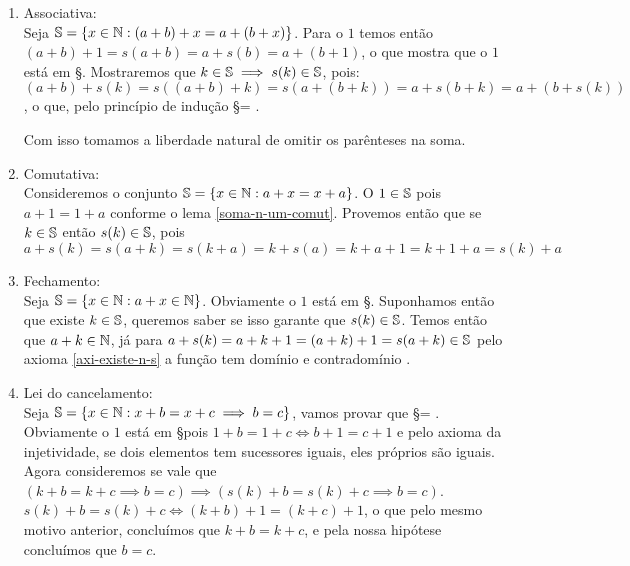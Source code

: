 \documentclass[../main.tex]{subfiles}
\begin{document}
\begin{dem}
    \begin{enumerate}[label=(\roman*)]
        \item Associativa: \\
             Seja $\S = \{ x \in \N : (a + b) + x = a + (b + x) \}$. Para o $1$ temos então
             $(a + b) + 1 = s(a + b) = a + s(b) = a + (b + 1)$, o que mostra que o $1$ está em \S. 
             Mostraremos que $k \in \S \implies s(k) \in \S$, pois:
             $(a + b) + s(k) = s( (a + b) + k) = s(a + (b + k)) = a + s(b + k) = a + (b + s(k))$, o que, pelo princípio de indução \S = \N.
        
            Com isso tomamos a liberdade natural de omitir os parênteses na soma.
       
        \item Comutativa: \\
            Consideremos o conjunto $\S = \{ x \in \N : a + x = x + a\}$. O $1 \in \S$ pois 
            $a + 1 = 1 + a$ conforme o lema \ref{soma-n-um-comut}.
            Provemos então que se $k \in \S$ então $s(k) \in \S$, pois 
            $a + s(k) = s(a + k) = s(k + a) = k + s(a) = k + a + 1 = k + 1 + a = s(k) + a$
    
        \item Fechamento: \\
            Seja $\S = \{ x \in \N : a + x \in \N \}$. Obviamente o $1$ está em \S. Suponhamos então que existe $k \in \S$, queremos saber se isso garante que $s(k) \in \S$. Temos então que $a + k \in \N$, já para $a + s(k) = a + k + 1 = (a + k) + 1 = s(a + k) \in \S$ pelo axioma \ref{axi-existe-n-s} a função tem domínio e contradomínio \N.
    
    
        \item Lei do cancelamento: \\
            Seja $\S = \{ x \in \N : x + b = x + c \implies b = c \}$, vamos provar que \S = \N. Obviamente o $1$ está em \S pois $1 + b = 1 + c \iff b + 1 = c + 1$ e pelo axioma da injetividade, se dois elementos tem sucessores iguais, eles próprios são iguais. Agora consideremos se vale que $(k + b = k + c \implies b = c) \implies (s(k) + b = s(k) + c \implies b = c)$. \\
            $s(k) + b = s(k) + c \iff (k + b) + 1 = (k + c) + 1$, o que pelo mesmo motivo anterior, concluímos que $k + b = k + c$, e pela nossa hipótese concluímos que $b = c$.
    

\end{enumerate}
\end{dem}
\end{document}
